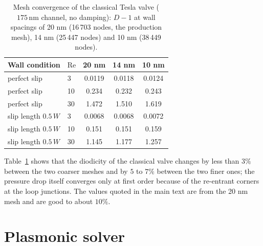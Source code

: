 \documentclass[aps,prapplied,onecolumn,superscriptaddress,floatfix]{revtex4-2}
\newcommand{\nm}{\,\mathrm{nm}}
\begin{document}
\begin{table}[ht]
\caption{Mesh convergence of the classical Tesla valve ($175\nm$ channel, no
damping): $D-1$ at wall spacings of 20 nm (16\,703 nodes, the production
mesh), 14 nm (25\,447 nodes) and 10 nm (38\,449 nodes).}
\label{tab:mesh}
\begin{ruledtabular}
\begin{tabular}{llccc}
Wall condition & $\mathrm{Re}$ & 20 nm & 14 nm & 10 nm \\
\hline
perfect slip & 3 & 0.0119 & 0.0118 & 0.0124 \\
perfect slip & 10 & 0.234 & 0.232 & 0.243 \\
perfect slip & 30 & 1.472 & 1.510 & 1.619 \\
slip length $0.5\,W$ & 3 & 0.0068 & 0.0068 & 0.0072 \\
slip length $0.5\,W$ & 10 & 0.151 & 0.151 & 0.159 \\
slip length $0.5\,W$ & 30 & 1.145 & 1.177 & 1.257 \\
\end{tabular}
\end{ruledtabular}
\end{table}

Table~\ref{tab:mesh} shows that the diodicity of the classical valve
changes by less than $3\%$ between the two coarser meshes and by $5$ to
$7\%$ between the two finer ones; the pressure drop itself converges only
at first order because of the re-entrant corners at the loop junctions. The
values quoted in the main text are from the 20 nm mesh and are good to
about $10\%$.

\section{Plasmonic solver}
\end{document}
